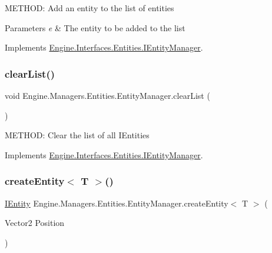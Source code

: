 M\+E\+T\+H\+OD\+: Add an entity to the list of entities 


\begin{DoxyParams}{Parameters}
{\em e} & The entity to be added to the list\\
\hline
\end{DoxyParams}


Implements \hyperlink{a00442_af229fa3936a8483383bb7ddd5b4184b0}{Engine.\+Interfaces.\+Entities.\+I\+Entity\+Manager}.

\mbox{\label{a00518_a4eff29b463061f602be758bd3d36ef25}} 
\subsubsection{\texorpdfstring{clear\+List()}{clearList()}}
{\footnotesize\ttfamily void Engine.\+Managers.\+Entities.\+Entity\+Manager.\+clear\+List (\begin{DoxyParamCaption}{ }\end{DoxyParamCaption})\hspace{0.3cm}{\ttfamily [inline]}}



M\+E\+T\+H\+OD\+: Clear the list of all I\+Entities 



Implements \hyperlink{a00442_acccc889cc99843899ce0652a9959e907}{Engine.\+Interfaces.\+Entities.\+I\+Entity\+Manager}.

\mbox{\label{a00518_a228280a4515648318fb5528936249a8b}} 
\subsubsection{\texorpdfstring{create\+Entity$<$ T $>$()}{createEntity< T >()}}
{\footnotesize\ttfamily \hyperlink{a00438}{I\+Entity} Engine.\+Managers.\+Entities.\+Entity\+Manager.\+create\+Entity$<$ T $>$ (\begin{DoxyParamCaption}\item[{Vector2}]{Position }\end{DoxyParamCaption})\hspace{0.3cm}{\ttfamily [inline]}}



